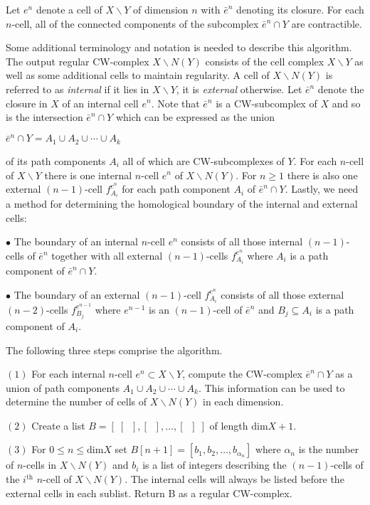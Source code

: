 \documentclass[a4paper,11pt]{report}
\begin{document}
{{Let $e^n$ denote a cell of $X \backslash Y$ of dimension $n$ with $\bar{e}^n$ denoting its closure. For each $n$-cell, all of the connected components of the subcomplex $\bar{e}^n \cap Y$ are contractible. 

Some additional terminology and notation is needed to describe this algorithm.
The output regular CW-complex $X \backslash N(Y)$ consists of the cell complex $X \backslash Y$ as well as some additional cells to maintain regularity. A cell of $ X \backslash N(Y)$ is referred to as \emph{internal} if it lies in $X \backslash Y$, it is \emph{external} otherwise. Let $\bar{e}^n$ denote the closure in $X$ of an internal cell $e^n$. Note that $\bar{e}^n$ is a CW-subcomplex of $X$ and so is the intersection $\bar{e}^n \cap Y$ which can be expressed as the union 

$\bar{e}^n \cap Y = A_1 \cup A_2 \cup \cdots \cup A_k$ 

 of its path components $A_i$ all of which are CW-subcomplexes of $Y$. For each $n$-cell of $X \backslash Y$ there is one internal $n$-cell $e^n$ of $X \backslash N(Y)$. For $n \geq 1$ there is also one external $(n-1)$-cell $f^{e^n}_{A_i}$ for each path component $A_i$ of $\bar{e}^n \cap Y$. Lastly, we need a method for determining the homological boundary of the
internal and external cells: 

$\bullet$ The boundary of an internal $n$-cell $e^n$ consists of all those internal $(n-1)$-cells of $\bar{e}^n$ together with all external $(n-1)$-cells $f^{e^n}_{A_i}$ where $A_i$ is a path component of $\bar{e}^n \cap Y$. 

$\bullet$ The boundary of an external $(n-1)$-cell $f^{e^n}_{A_i}$ consists of all those external $(n-2)$-cells $f^{e^{n-1}}_{B_j}$ where $e^{n-1}$ is an $(n-1)$-cell of $\bar{e}^n$ and $B_j \subseteq A_i$ is a path component of $A_i$. 

The following three steps comprise the algorithm. 

$(1)$ For each internal $n$-cell $e^n \subset X \backslash Y$, compute the CW-complex $\bar{e}^n \cap Y$ as a union of path components $A_1 \cup A_2 \cup \cdots \cup A_k$. This information can be used to determine the number of cells of $X \backslash N(Y)$ in each dimension. 

$(2)$ Create a list $B=[ \; [ \; \; ], [ \; \; ], \ldots, [ \; \; ] \; ]$ of length $\textrm{dim}X +1$. 

$(3)$ For $0 \leq n \leq \textrm{dim}X$ set $B[n+1]=[ b_1, b_2, \ldots, b_{\alpha_n} ]$ where $\alpha_n$ is the number of $n$-cells in $X \backslash N(Y)$ and $b_i$ is a list of integers describing the $(n-1)$-cells of the $i ^ \textrm{th}$ $n$-cell of $X \backslash N(Y)$. The internal cells will always be listed before the external cells in each
sublist. Return B as a regular CW-complex. 

}}
\end{document}
